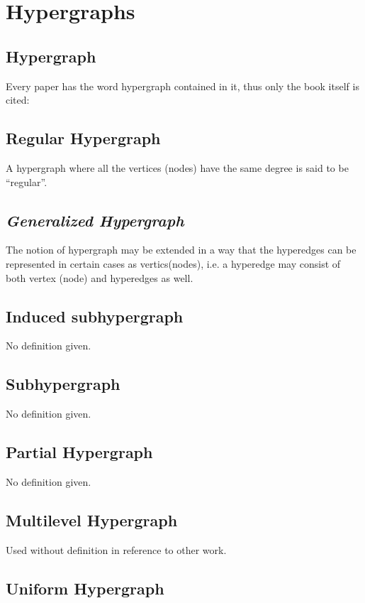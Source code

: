\documentclass[10pt]{article}
\begin{document}
\section{Hypergraphs}
\subsection{Hypergraph}
Every paper has the word hypergraph contained in it, thus only the book itself is cited: ~\cite{Hypergraph:Book}


\subsection{Regular Hypergraph}
A hypergraph where all the vertices (nodes) have the same degree is said to be ``regular''.
~\cite{Hypergraph:Book}

\subsection{\textit{Generalized Hypergraph}}
The notion of hypergraph may be extended in a way that the hyperedges can be represented in certain cases as vertics(nodes), i.e. a hyperedge may consist of both vertex (node) and hyperedges as well. ~\cite{molnar2014applications}

\subsection{Induced subhypergraph}
No definition given. ~\cite{molnar2014applications}
\subsection{Subhypergraph}
No definition given. ~\cite{molnar2014applications}
\subsection{Partial Hypergraph}
No definition given. ~\cite{molnar2014applications}


\subsection{Multilevel Hypergraph}
Used without definition in reference to other work. ~\cite{catalyurek2007hypergraph}

\subsection{Uniform Hypergraph}
\end{document}
